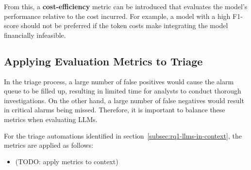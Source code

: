 From this, a \textbf{cost-efficiency} metric can be introduced that evaluates the model's performance relative to the
cost incurred.
For example, a model with a high F1-score should not be preferred if the token costs make integrating the model
financially infeasible.

\subsection{Applying Evaluation Metrics to Triage}
\label{subsec:rq2-evaluating-triage}

In the triage process, a large number of false positives would cause the alarm queue to be filled up, resulting in
limited time for analysts to conduct thorough investigations.
On the other hand, a large number of false negatives would result in critical alarms being missed.
Therefore, it is important to balance these metrics when evaluating LLMs.

For the triage automations identified in section\ \ref{subsec:rq1-llms-in-context}, the metrics are applied as
follows:
\begin{itemize}
    \item (TODO: apply metrics to context) %
\end{itemize}
